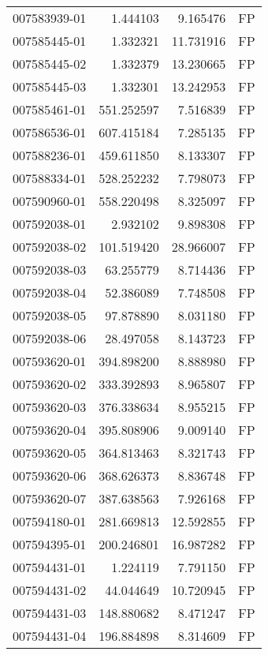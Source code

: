 \begin{tabular}{lrrl}
007583939-01 &    1.444103 &       9.165476 &   FP \\
007585445-01 &    1.332321 &      11.731916 &   FP \\
007585445-02 &    1.332379 &      13.230665 &   FP \\
007585445-03 &    1.332301 &      13.242953 &   FP \\
007585461-01 &  551.252597 &       7.516839 &   FP \\
007586536-01 &  607.415184 &       7.285135 &   FP \\
007588236-01 &  459.611850 &       8.133307 &   FP \\
007588334-01 &  528.252232 &       7.798073 &   FP \\
007590960-01 &  558.220498 &       8.325097 &   FP \\
007592038-01 &    2.932102 &       9.898308 &   FP \\
007592038-02 &  101.519420 &      28.966007 &   FP \\
007592038-03 &   63.255779 &       8.714436 &   FP \\
007592038-04 &   52.386089 &       7.748508 &   FP \\
007592038-05 &   97.878890 &       8.031180 &   FP \\
007592038-06 &   28.497058 &       8.143723 &   FP \\
007593620-01 &  394.898200 &       8.888980 &   FP \\
007593620-02 &  333.392893 &       8.965807 &   FP \\
007593620-03 &  376.338634 &       8.955215 &   FP \\
007593620-04 &  395.808906 &       9.009140 &   FP \\
007593620-05 &  364.813463 &       8.321743 &   FP \\
007593620-06 &  368.626373 &       8.836748 &   FP \\
007593620-07 &  387.638563 &       7.926168 &   FP \\
007594180-01 &  281.669813 &      12.592855 &   FP \\
007594395-01 &  200.246801 &      16.987282 &   FP \\
007594431-01 &    1.224119 &       7.791150 &   FP \\
007594431-02 &   44.044649 &      10.720945 &   FP \\
007594431-03 &  148.880682 &       8.471247 &   FP \\
007594431-04 &  196.884898 &       8.314609 &   FP \\

\end{tabular}
